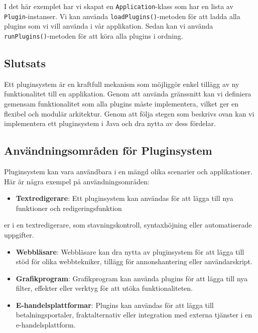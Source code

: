 I det här exemplet har vi skapat en \texttt{Application}-klass som har
en lista av \texttt{Plugin}-instanser. Vi kan använda
\texttt{loadPlugins()}-metoden för att ladda alla plugins som vi vill
använda i vår applikation. Sedan kan vi använda
\texttt{runPlugins()}-metoden för att köra alla plugins i ordning.

\hypertarget{slutsats}{%
\subsection{Slutsats}\label{slutsats}}

Ett pluginsystem är en kraftfull mekanism som möjliggör enkel tillägg av
ny funktionalitet till en applikation. Genom att använda gränssnitt kan
vi definiera gemensam funktionalitet som alla plugins måste
implementera, vilket ger en flexibel och modulär arkitektur. Genom att
följa stegen som beskrivs ovan kan vi implementera ett pluginsystem i
Java och dra nytta av dess fördelar.

\hypertarget{anvuxe4ndningsomruxe5den-fuxf6r-pluginsystem}{%
\subsection{Användningsområden för
Pluginsystem}\label{anvuxe4ndningsomruxe5den-fuxf6r-pluginsystem}}

Pluginsystem kan vara användbara i en mängd olika scenarier och
applikationer. Här är några exempel på användningsområden:

\begin{itemize}
\tightlist
\item
  \textbf{Textredigerare}: Ett pluginsystem kan användas för att lägga
  till nya funktioner och redigeringsfunktion
\end{itemize}

er i en textredigerare, som stavningskontroll, syntaxhöjning eller
automatiserade uppgifter.

\begin{itemize}
\item
  \textbf{Webbläsare}: Webbläsare kan dra nytta av pluginsystem för att
  lägga till stöd för olika webbtekniker, tillägg för annonshantering
  eller användarskript.
\item
  \textbf{Grafikprogram}: Grafikprogram kan använda plugins för att
  lägga till nya filter, effekter eller verktyg för att utöka
  funktionaliteten.
\item
  \textbf{E-handelsplattformar}: Plugins kan användas för att lägga till
  betalningsportaler, fraktalternativ eller integration med externa
  tjänster i en e-handelsplattform.
\end{itemize}

